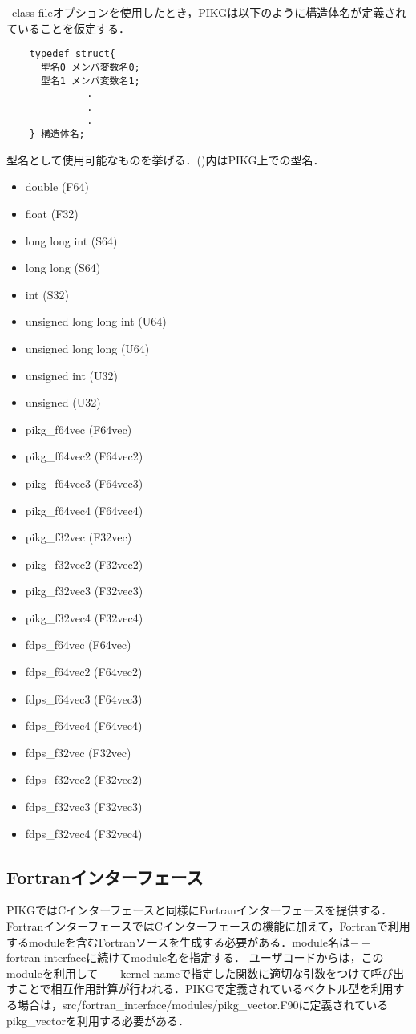 \documentclass{article}
\begin{document}
--class-fileオプションを使用したとき，PIKGは以下のように構造体名が定義されていることを仮定する．
\begin{verbatim}
	typedef struct{
	  型名0 メンバ変数名0;
	  型名1 メンバ変数名1;
	          .
	          .
	          .
	} 構造体名;
\end{verbatim}
型名として使用可能なものを挙げる．()内はPIKG上での型名．
 \begin{itemize}
  \item double (F64)
  \item float (F32)
  \item long long int (S64)
  \item long long (S64)
  \item int (S32)
  \item unsigned long long int (U64)
  \item unsigned long long (U64)
  \item unsigned int (U32)
  \item unsigned (U32)
  \item pikg\_f64vec (F64vec)
  \item pikg\_f64vec2 (F64vec2)
  \item pikg\_f64vec3 (F64vec3)
  \item pikg\_f64vec4 (F64vec4)
  \item pikg\_f32vec (F32vec)
  \item pikg\_f32vec2 (F32vec2)
  \item pikg\_f32vec3 (F32vec3)
  \item pikg\_f32vec4 (F32vec4)
  \item fdps\_f64vec (F64vec)
  \item fdps\_f64vec2 (F64vec2)
  \item fdps\_f64vec3 (F64vec3)
  \item fdps\_f64vec4 (F64vec4)
  \item fdps\_f32vec (F32vec)
  \item fdps\_f32vec2 (F32vec2)
  \item fdps\_f32vec3 (F32vec3)
  \item fdps\_f32vec4 (F32vec4)
 \end{itemize}

\subsection{Fortranインターフェース}
PIKGではCインターフェースと同様にFortranインターフェースを提供する．
FortranインターフェースではCインターフェースの機能に加えて，Fortranで利用するmoduleを含むFortranソースを生成する必要がある．module名は$--$fortran-interfaceに続けてmodule名を指定する．
ユーザコードからは，このmoduleを利用して$--$kernel-nameで指定した関数に適切な引数をつけて呼び出すことで相互作用計算が行われる．PIKGで定義されているベクトル型を利用する場合は，src/fortran\_interface/modules/pikg\_vector.F90に定義されているpikg\_vectorを利用する必要がある．
\end{document}
